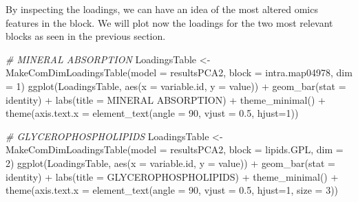 \documentclass[
]{book}
\newenvironment{Shaded}{\begin{snugshade}}{\end{snugshade}}
\newcommand{\AttributeTok}[1]{\textcolor[rgb]{0.77,0.63,0.00}{#1}}
\newcommand{\CommentTok}[1]{\textcolor[rgb]{0.56,0.35,0.01}{\textit{#1}}}
\newcommand{\DecValTok}[1]{\textcolor[rgb]{0.00,0.00,0.81}{#1}}
\newcommand{\FloatTok}[1]{\textcolor[rgb]{0.00,0.00,0.81}{#1}}
\newcommand{\FunctionTok}[1]{\textcolor[rgb]{0.00,0.00,0.00}{#1}}
\newcommand{\NormalTok}[1]{#1}
\newcommand{\OtherTok}[1]{\textcolor[rgb]{0.56,0.35,0.01}{#1}}
\newcommand{\SpecialCharTok}[1]{\textcolor[rgb]{0.00,0.00,0.00}{#1}}
\newcommand{\StringTok}[1]{\textcolor[rgb]{0.31,0.60,0.02}{#1}}
\begin{document}
By inspecting the loadings, we can have an idea of the most altered omics
features in the block.
We will plot now the loadings for the two most relevant blocks as seen in the
previous section.

\begin{Shaded}
\begin{Highlighting}[]
  \CommentTok{\# MINERAL ABSORPTION}
\NormalTok{  LoadingsTable }\OtherTok{\textless{}{-}} \FunctionTok{MakeComDimLoadingsTable}\NormalTok{(}\AttributeTok{model =}\NormalTok{ resultsPCA2,}
                                           \AttributeTok{block =} \StringTok{\textquotesingle{}intra.map04978\textquotesingle{}}\NormalTok{,}
                                           \AttributeTok{dim =} \DecValTok{1}\NormalTok{)}
  \FunctionTok{ggplot}\NormalTok{(LoadingsTable, }\FunctionTok{aes}\NormalTok{(}\AttributeTok{x =}\NormalTok{ variable.id, }\AttributeTok{y =}\NormalTok{ value)) }\SpecialCharTok{+}
    \FunctionTok{geom\_bar}\NormalTok{(}\AttributeTok{stat =} \StringTok{\textquotesingle{}identity\textquotesingle{}}\NormalTok{) }\SpecialCharTok{+}
    \FunctionTok{labs}\NormalTok{(}\AttributeTok{title =} \StringTok{\textquotesingle{}MINERAL ABSORPTION\textquotesingle{}}\NormalTok{) }\SpecialCharTok{+}
    \FunctionTok{theme\_minimal}\NormalTok{() }\SpecialCharTok{+}
    \FunctionTok{theme}\NormalTok{(}\AttributeTok{axis.text.x =} \FunctionTok{element\_text}\NormalTok{(}\AttributeTok{angle =} \DecValTok{90}\NormalTok{, }\AttributeTok{vjust =} \FloatTok{0.5}\NormalTok{, }\AttributeTok{hjust=}\DecValTok{1}\NormalTok{))}

  \CommentTok{\# GLYCEROPHOSPHOLIPIDS}
\NormalTok{  LoadingsTable }\OtherTok{\textless{}{-}} \FunctionTok{MakeComDimLoadingsTable}\NormalTok{(}\AttributeTok{model =}\NormalTok{ resultsPCA2,}
                                           \AttributeTok{block =} \StringTok{\textquotesingle{}lipids.GPL\textquotesingle{}}\NormalTok{,}
                                           \AttributeTok{dim =} \DecValTok{2}\NormalTok{)}
  \FunctionTok{ggplot}\NormalTok{(LoadingsTable, }\FunctionTok{aes}\NormalTok{(}\AttributeTok{x =}\NormalTok{ variable.id, }\AttributeTok{y =}\NormalTok{ value)) }\SpecialCharTok{+}
    \FunctionTok{geom\_bar}\NormalTok{(}\AttributeTok{stat =} \StringTok{\textquotesingle{}identity\textquotesingle{}}\NormalTok{) }\SpecialCharTok{+}
        \FunctionTok{labs}\NormalTok{(}\AttributeTok{title =} \StringTok{\textquotesingle{}GLYCEROPHOSPHOLIPIDS\textquotesingle{}}\NormalTok{) }\SpecialCharTok{+}
    \FunctionTok{theme\_minimal}\NormalTok{() }\SpecialCharTok{+}
    \FunctionTok{theme}\NormalTok{(}\AttributeTok{axis.text.x =} \FunctionTok{element\_text}\NormalTok{(}\AttributeTok{angle =} \DecValTok{90}\NormalTok{, }\AttributeTok{vjust =} \FloatTok{0.5}\NormalTok{, }\AttributeTok{hjust=}\DecValTok{1}\NormalTok{,}
                                     \AttributeTok{size =} \DecValTok{3}\NormalTok{))}
\end{Highlighting}
\end{Shaded}
\end{document}
